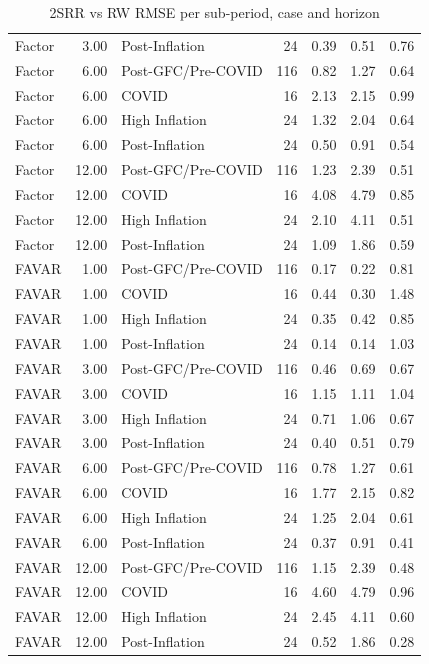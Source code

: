 \begin{table}[ht]
\begin{tabular}{lrlrrrr}
  Factor & 3.00 & Post-Inflation &  24 & 0.39 & 0.51 & 0.76 \\ 
  Factor & 6.00 & Post-GFC/Pre-COVID & 116 & 0.82 & 1.27 & 0.64 \\ 
  Factor & 6.00 & COVID &  16 & 2.13 & 2.15 & 0.99 \\ 
  Factor & 6.00 & High Inflation &  24 & 1.32 & 2.04 & 0.64 \\ 
  Factor & 6.00 & Post-Inflation &  24 & 0.50 & 0.91 & 0.54 \\ 
  Factor & 12.00 & Post-GFC/Pre-COVID & 116 & 1.23 & 2.39 & 0.51 \\ 
  Factor & 12.00 & COVID &  16 & 4.08 & 4.79 & 0.85 \\ 
  Factor & 12.00 & High Inflation &  24 & 2.10 & 4.11 & 0.51 \\ 
  Factor & 12.00 & Post-Inflation &  24 & 1.09 & 1.86 & 0.59 \\ 
  FAVAR & 1.00 & Post-GFC/Pre-COVID & 116 & 0.17 & 0.22 & 0.81 \\ 
  FAVAR & 1.00 & COVID &  16 & 0.44 & 0.30 & 1.48 \\ 
  FAVAR & 1.00 & High Inflation &  24 & 0.35 & 0.42 & 0.85 \\ 
  FAVAR & 1.00 & Post-Inflation &  24 & 0.14 & 0.14 & 1.03 \\ 
  FAVAR & 3.00 & Post-GFC/Pre-COVID & 116 & 0.46 & 0.69 & 0.67 \\ 
  FAVAR & 3.00 & COVID &  16 & 1.15 & 1.11 & 1.04 \\ 
  FAVAR & 3.00 & High Inflation &  24 & 0.71 & 1.06 & 0.67 \\ 
  FAVAR & 3.00 & Post-Inflation &  24 & 0.40 & 0.51 & 0.79 \\ 
  FAVAR & 6.00 & Post-GFC/Pre-COVID & 116 & 0.78 & 1.27 & 0.61 \\ 
  FAVAR & 6.00 & COVID &  16 & 1.77 & 2.15 & 0.82 \\ 
  FAVAR & 6.00 & High Inflation &  24 & 1.25 & 2.04 & 0.61 \\ 
  FAVAR & 6.00 & Post-Inflation &  24 & 0.37 & 0.91 & 0.41 \\ 
  FAVAR & 12.00 & Post-GFC/Pre-COVID & 116 & 1.15 & 2.39 & 0.48 \\ 
  FAVAR & 12.00 & COVID &  16 & 4.60 & 4.79 & 0.96 \\ 
  FAVAR & 12.00 & High Inflation &  24 & 2.45 & 4.11 & 0.60 \\ 
  FAVAR & 12.00 & Post-Inflation &  24 & 0.52 & 1.86 & 0.28 \\ 
   \hline
\end{tabular}
\caption{2SRR vs RW RMSE per sub-period, case and horizon} 
\label{tab:subperiods}
\end{table}
